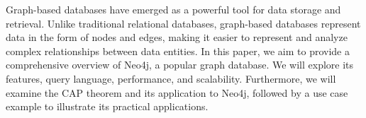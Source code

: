 
Graph-based databases have emerged as a powerful tool for data storage and retrieval. Unlike traditional relational databases, graph-based databases represent data in the form of nodes and edges, making it easier to represent and analyze complex relationships between data entities. 
In this paper, we aim to provide a comprehensive overview of Neo4j, a popular graph database. We will explore its features, query language, performance, and scalability. Furthermore, we will examine the CAP theorem and its application to Neo4j, followed by a use case example to illustrate its practical applications. 
